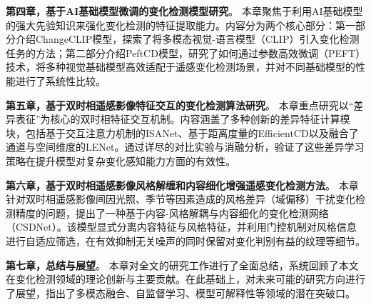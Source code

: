 \textbf{第四章，基于AI基础模型微调的变化检测模型研究}。 本章聚焦于利用AI基础模型的强大先验知识来强化变化检测的特征提取能力。内容分为两个核心部分：第一部分介绍ChangeCLIP模型，探索了将多模态视觉-语言模型（CLIP）引入变化检测任务的方法；第二部分介绍PeftCD模型，研究了如何通过参数高效微调（PEFT）技术，将多种视觉基础模型高效适配于遥感变化检测场景，并对不同基础模型的性能进行了系统性比较。

\textbf{第五章，基于双时相遥感影像特征交互的变化检测算法研究}。 本章重点研究以“差异表征”为核心的双时相特征交互机制。内容涵盖了多种创新的差异特征计算模块，包括基于交互注意力机制的ISANet、基于距离度量的EfficientCD以及融合了通道与空间维度的LENet。通过详尽的对比实验与消融分析，验证了这些差异学习策略在提升模型对复杂变化感知能力方面的有效性。

\textbf{第六章，基于双时相遥感影像风格解缠和内容细化增强遥感变化检测方法}。 本章针对双时相遥感影像间因光照、季节等因素造成的风格差异（域偏移）干扰变化检测精度的问题，提出了一种基于内容-风格解耦与内容细化的变化检测网络（CSDNet）。该模型显式分离内容特征与风格特征，并利用门控机制对风格信息进行自适应筛选，在有效抑制无关噪声的同时保留对变化判别有益的纹理等细节。

\textbf{第七章，总结与展望}。 本章对全文的研究工作进行了全面总结，系统回顾了本文在变化检测领域的理论创新与主要贡献。在此基础上，对未来可能的研究方向进行了展望，指出了多模态融合、自监督学习、模型可解释性等领域的潜在突破口。